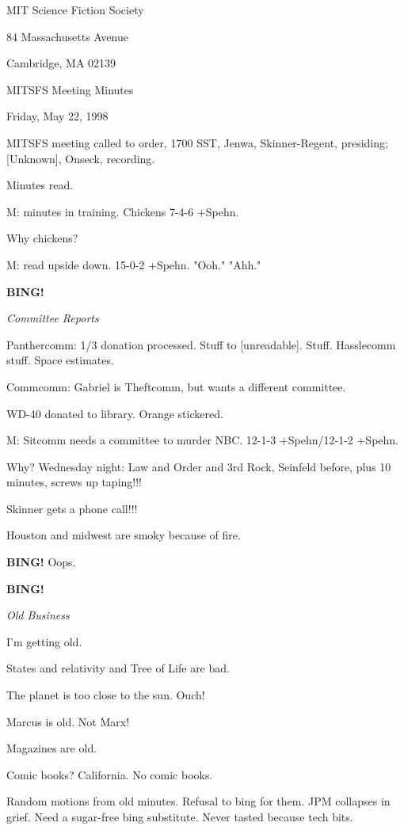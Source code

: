 \documentclass[12pt]{article}
\newcommand{\bing}{{\bf BING!} }
\newcommand{\goto}[1]{\bing \vskip 12pt \centerline{{\em{#1}}}}
\begin{document}
\begin{center}

MIT Science Fiction Society 

84 Massachusetts Avenue

Cambridge, MA 02139

\vspace{12pt}

MITSFS Meeting Minutes 

Friday, May 22, 1998

\end{center}
 
\vspace{18pt}

\setlength{\parskip}{6pt}

\noindent
MITSFS meeting called to order, 1700 SST,
Jenwa, Skinner-Regent, presiding; [Unknown], Onseck, recording.

Minutes read.

M: minutes in training. Chickens 7-4-6 +Spehn.

Why chickens?

M: read upside down. 15-0-2 +Spehn. "Ooh." "Ahh."

\goto{Committee Reports}

Panthercomm: 1/3 donation processed. Stuff to [unreadable]. Stuff. Hasslecomm stuff. Space estimates.

Commcomm: Gabriel is Theftcomm, but wants a different committee.

WD-40 donated to library. Orange stickered.

M: Sitcomm needs a committee to murder NBC. 12-1-3 +Spehn/12-1-2 +Spehn.

Why? Wednesday night: Law and Order and 3rd Rock, Seinfeld before, plus 10 minutes, screws up taping!!!

Skinner gets a phone call!!!

Houston and midwest are smoky because of fire.

\bing Oops.

\goto{Old Business}

I'm getting old.

States and relativity and Tree of Life are bad.

The planet is too close to the sun. Ouch!

Marcus is old. Not Marx!

Magazines are old.

Comic books? California. No comic books.

Random motions from old minutes. Refusal to bing for them. JPM collapses in grief. Need a sugar-free bing substitute. Never tasted because tech bits.
\end{document}
